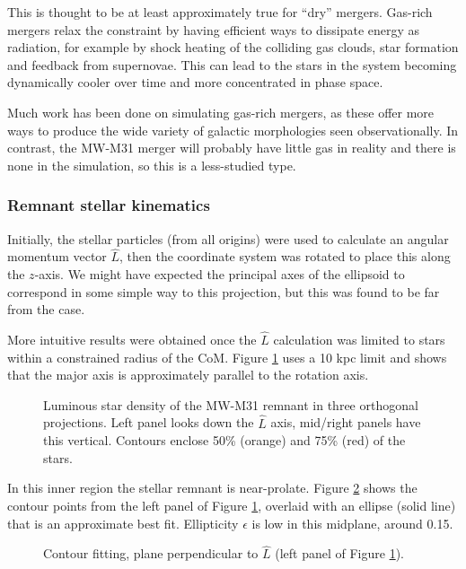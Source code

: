 \documentclass[twocolumn]{aastex63}
\begin{document}
This is thought to be at least approximately true for ``dry'' mergers. Gas-rich mergers relax the constraint by having efficient ways to dissipate energy as radiation, for example by shock heating of the colliding gas clouds, star formation and feedback from supernovae. This can lead to the stars in the system becoming dynamically cooler over time and more concentrated in phase space.

Much work has been done on simulating gas-rich mergers, as these offer more ways to produce the wide variety of galactic morphologies seen observationally. In contrast, the MW-M31 merger will probably have little gas in reality and there is none in the simulation, so this is a less-studied type.

\subsubsection{Remnant stellar kinematics}

Initially, the stellar particles (from all origins) were used to calculate an angular momentum vector $\hat{L}$, then the coordinate system was rotated to place this along the $z$-axis. We might have expected the principal axes of the ellipsoid to correspond in some simple way to this projection, but this was found to be far from the case.

More intuitive results were obtained once the $\hat{L}$ calculation was limited to stars within a constrained radius of the CoM.  Figure \ref{fig:rem_shape_10} uses a 10 kpc limit and shows that the major axis is approximately parallel to the rotation axis.

\begin{figure}[htb!]
	\caption{Luminous star density of the MW-M31 remnant in three orthogonal projections. Left panel looks down the $\hat{L}$ axis, mid/right panels have this vertical. Contours enclose 50\% (orange) and 75\% (red) of the stars.
		\label{fig:rem_shape_10}}
\end{figure}

In this inner region the stellar remnant is near-prolate. Figure \ref{fig:isophote_xy} shows the contour points from the left panel of Figure \ref{fig:rem_shape_10}, overlaid with an ellipse (solid line) that is an approximate best fit. Ellipticity $\epsilon$ is low in this midplane, around 0.15.

\begin{figure}[htb!]
	\caption{Contour fitting, plane perpendicular to $\hat{L}$ (left panel of Figure \ref{fig:rem_shape_10}).
		\label{fig:isophote_xy}}
\end{figure}
\end{document}
